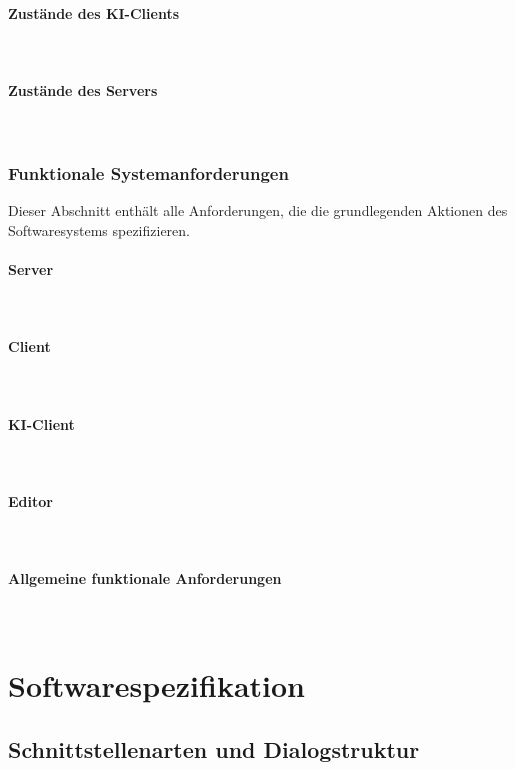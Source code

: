 \documentclass{uulm-assignment}
\begin{document}
\paragraph{Zustände des KI-Clients} \mbox{}\\

\clearpage
\paragraph{Zustände des Servers} \mbox{}\\


\clearpage
\subsubsection{Funktionale Systemanforderungen}
Dieser Abschnitt enthält alle Anforderungen, die die grundlegenden Aktionen des Softwaresystems spezifizieren.
\paragraph{Server} \mbox{}\\

\paragraph{Client} \mbox{}\\

\paragraph{KI-Client} \mbox{}\\

\paragraph{Editor} \mbox{}\\

\paragraph{Allgemeine funktionale Anforderungen} \mbox{}\\


\clearpage
\section{Softwarespezifikation}
\subsection{Schnittstellenarten und Dialogstruktur}
\end{document}
